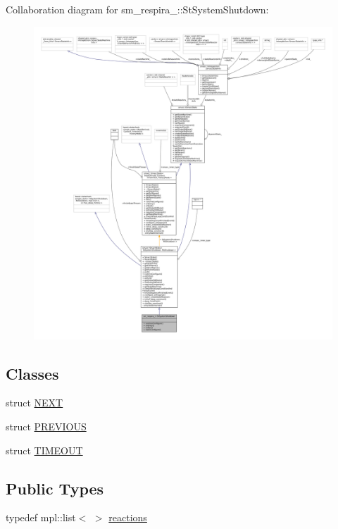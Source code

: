 Collaboration diagram for sm\+\_\+respira\+\_\+:\+:St\+System\+Shutdown\+:
\nopagebreak
\begin{figure}[H]
\begin{center}
\leavevmode
\includegraphics[width=350pt]{structsm__respira__1_1_1StSystemShutdown__coll__graph}
\end{center}
\end{figure}
\subsection*{Classes}
\begin{DoxyCompactItemize}
\item 
struct \hyperlink{structsm__respira__1_1_1StSystemShutdown_1_1NEXT}{N\+E\+XT}
\item 
struct \hyperlink{structsm__respira__1_1_1StSystemShutdown_1_1PREVIOUS}{P\+R\+E\+V\+I\+O\+US}
\item 
struct \hyperlink{structsm__respira__1_1_1StSystemShutdown_1_1TIMEOUT}{T\+I\+M\+E\+O\+UT}
\end{DoxyCompactItemize}
\subsection*{Public Types}
\begin{DoxyCompactItemize}
\item 
typedef mpl\+::list$<$ $>$ \hyperlink{structsm__respira__1_1_1StSystemShutdown_ae6fd4a2dbf4f3a8aa45f21074254a24e}{reactions}
\end{DoxyCompactItemize}
